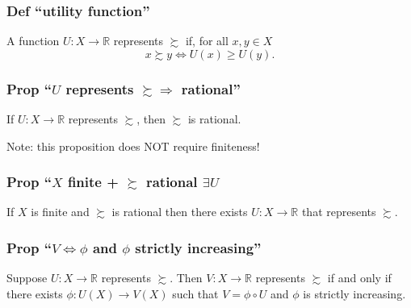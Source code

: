 \documentclass[
]{article}
\begin{document}
\hypertarget{def-utility-function}{%
\subsubsection{Def ``utility function''}\label{def-utility-function}}

A function \(U: X \rightarrow \mathbb{R}\) represents \(\succsim\) if,
for all \(x, y \in X\) \[x \succsim y \iff U(x) \geq U(y).\]

\hypertarget{prop-u-represents-succsim-rightarrow-rational}{%
\subsubsection{\texorpdfstring{Prop ``\(U\) represents
\(\succsim \Rightarrow\)
rational''}{Prop ``U represents \textbackslash succsim \textbackslash Rightarrow rational''}}\label{prop-u-represents-succsim-rightarrow-rational}}

If \(U: X \rightarrow \mathbb{R}\) represents \(\succsim\), then
\(\succsim\) is rational.

Note: this proposition does NOT require finiteness!

\hypertarget{prop-x-finite-succsim-rational-exists-u}{%
\subsubsection{\texorpdfstring{Prop ``\(X\) finite + \(\succsim\)
rational
\Rightarrow \(\exists U\)}{Prop ``X finite + \textbackslash succsim rational \textbackslash exists U}}\label{prop-x-finite-succsim-rational-exists-u}}

If \(X\) is finite and \(\succsim\) is rational then there exists
\(U: X \rightarrow \mathbb{R}\) that represents \(\succsim\).

\hypertarget{prop-v-iff-phi-and-phi-strictly-increasing}{%
\subsubsection{\texorpdfstring{Prop ``\(V \iff \phi\) and \(\phi\)
strictly
increasing''}{Prop ``V \textbackslash iff \textbackslash phi and \textbackslash phi strictly increasing''}}\label{prop-v-iff-phi-and-phi-strictly-increasing}}

Suppose \(U: X \rightarrow \mathbb{R}\) represents \(\succsim\). Then
\(V: X \rightarrow \mathbb{R}\) represents \(\succsim\) if and only if
there exists \(\phi: U(X) \rightarrow V(X)\) such that
\(V = \phi \circ U\) and \(\phi\) is strictly increasing.
\end{document}
